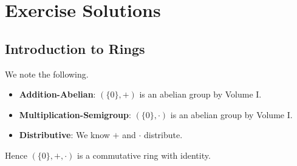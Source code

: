 \appendix
\chapter{Exercise Solutions}
\section{Introduction to Rings}
\begin{questions}
    \item We note the following.
    \begin{itemize}
        \item \textbf{Addition-Abelian}: $(\{0\}, +)$ is an abelian group by Volume I.
        \item \textbf{Multiplication-Semigroup}: $(\{0\}, \cdot)$ is an abelian group by Volume I.
        \item \textbf{Distributive}: We know $+$ and $\cdot$ distribute.
    \end{itemize}
    Hence $(\{0\}, +, \cdot)$ is a commutative ring with identity.
\end{questions}

